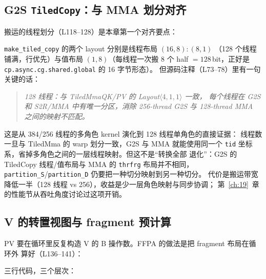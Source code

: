 \subsection{G2S \texttt{TiledCopy}：与 MMA 划分对齐}

搬运的线程划分（L118--128）是本章第一个对齐要点：



\texttt{make\_\allowbreak{}tiled\_\allowbreak{}copy} 的两个 layout 分别是线程布局 $(16,8):(8,1)$
（128 个线程铺满，行优先）与值布局 $(1,8)$（每线程一次搬 8 个 half
$=128$\,bit，正好是 \texttt{cp.\allowbreak{}async.\allowbreak{}cg.\allowbreak{}shared.\allowbreak{}global} 的 16 字节形态）。
但源码注释（L73--78）里有一句关键的话：

\begin{quote}
  \textit{128 线程：与 TiledMmaQK/PV 的 Layout$\langle4,1,1\rangle$ 一致，
  每个线程在 G2S 和 S2R/MMA 中有唯一分区，消除 256-thread G2S 与
  128-thread MMA 之间的映射不匹配。}
\end{quote}

这是从 384/256 线程的多角色 kernel 演化到 128 线程单角色的直接证据：
线程数一旦与 TiledMma 的 warp 划分一致，G2S 与 MMA 就能使用同一个
\texttt{tid} 坐标系，省掉多角色之间的一层线程映射。但这不是“转换全部
退化”：G2S 的 TiledCopy 线程/值布局与 MMA 的 \texttt{thrfrg} 布局并不相同，
\texttt{partition\_S}/\texttt{partition\_D} 仍要把一种切分映射到另一种切分。
代价是搬运带宽降低一半（128 线程 vs 256），收益是少一层角色映射与同步协调；
第~\ref{ch:19}~章的性能节从吞吐角度讨论过这项开销。

\subsection{V 的转置视图与 fragment 预计算}

PV 要在循环里反复构造 V 的 B 操作数。FFPA 的做法是把 fragment 布局在循环外
算好（L136--141）：



三行代码，三个层次：

